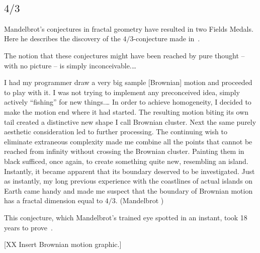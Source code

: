 \documentclass{llncs}
\begin{document}
\subsection{$4/3$}
Mandelbrot's conjectures in fractal geometry have resulted in two
Fields Medals.  Here he describes the discovery of the
$4/3$-conjecture made in~\cite{ManFN}.  

\bigskip

{

  \narrower\it 

  The notion that these conjectures might have been reached by pure
  thought -- with no picture -- is simply inconceivable.\dots

  I had my programmer draw a very big sample [Brownian] motion and
  proceeded to play with it. I was not trying to implement any
  preconceived idea, simply actively ``fishing'' for new things.\dots
  In order to achieve homogeneity, I decided to make the motion end
  where it had started. The resulting motion biting its own tail
  created a distinctive new shape I call Brownian cluster.  Next the
  same purely aesthetic consideration led to further processing. The
  continuing wish to eliminate extraneous complexity made me combine
  all the points that cannot be reached from infinity without crossing
  the Brownian cluster. Painting them in black sufficed, once again,
  to create something quite new, resembling an island.  Instantly, it
  became apparent that its boundary deserved to be investigated. Just
  as instantly, my long previous experience with the coastlines of
  actual islands on Earth came handy and made me suspect that the
  boundary of Brownian motion has a fractal dimension equal to $4/3$.
  (Mandelbrot \cite{Man})

}

\bigskip

This conjecture, which  Mandelbrot's trained eye spotted in an instant,
took 18 years to prove~\cite{LSW01}.

[XX Insert Brownian motion graphic.]

%
%

\end{document}
